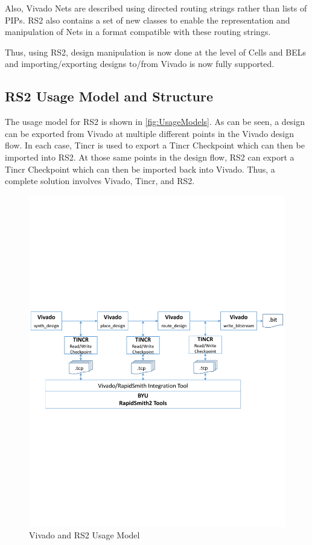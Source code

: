 \documentclass[12pt]{article}
\begin{document}
Also, Vivado Nets are described using directed routing strings rather than lists
of PIPs.  RS2 also contains a set of new classes to enable the representation
and manipulation of Nets in a format compatible with these routing strings.

Thus, using RS2, design manipulation is now done at the level of Cells and BELs
and importing/exporting designs to/from Vivado is now fully supported.

\subsection{RS2 Usage Model and Structure}
The usage model for RS2 is shown in \autoref{fig:UsageModels}.  As can be
seen, a design can be exported from Vivado at multiple different points in the
Vivado design flow.  In each case, Tincr is used to export a Tincr Checkpoint
which can then be imported into RS2.  At those same points in the design flow,
RS2 can export a Tincr Checkpoint which can then be imported back into Vivado. 
Thus, a complete solution involves Vivado, Tincr, and RS2.

\begin{figure}[htb]
\centering
\includegraphics[width=0.8\columnwidth]{UsageModels}
\caption{Vivado and RS2 Usage Model}
\label{fig:UsageModels}
\end{figure} 
\end{document}
